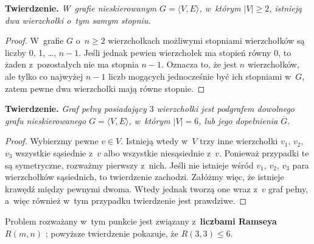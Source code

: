 
\subproblem %
\textsf{\textbf{Twierdzenie.}} \textit{W~grafie nieskierowanym\/ $G=\langle V,E\rangle$, w~którym\/ $|V|\ge2$, istnieją dwa wierzchołki o~tym samym stopniu.}
\begin{proof}
W~grafie $G$ o~$n\ge2$ wierzchołkach możliwymi stopniami wierzchołków są liczby 0, 1, \dots, $n-1$.
Jeśli jednak pewien wierzchołek ma stopień równy 0, to żaden z~pozostałych nie ma stopnia $n-1$.
Oznacza to, że jest $n$ wierzchołków, ale tylko co najwyżej $n-1$ liczb mogących jednocześnie być ich stopniami w~$G$, zatem pewne dwa wierzchołki mają równe stopnie.
\end{proof}

\subproblem %
\textsf{\textbf{Twierdzenie.}} \textit{Graf pełny posiadający\/ $3$ wierzchołki jest podgrafem dowolnego grafu nieskierowanego\/ $G=\langle V,E\rangle$, w~którym\/ $|V|=6$, lub jego dopełnienia\/ $\overline{G}$.}
\begin{proof}
Wybierzmy pewne $v\in V$.
Istnieją wtedy w~$V$ trzy inne wierzchołki $v_1$, $v_2$, $v_3$ wszystkie sąsiednie z~$v$ albo wszystkie niesąsiednie z~$v$.
Ponieważ przypadki te są symetryczne, rozważmy pierwszy z~nich.
Jeśli nie istnieje wśród $v_1$, $v_2$, $v_3$ para wierzchołków sąsiednich, to twierdzenie zachodzi.
Załóżmy więc, że istnieje krawędź między pewnymi dwoma.
Wtedy jednak tworzą one wraz z~$v$ graf pełny, a~więc również w~tym przypadku twierdzenie jest prawdziwe.
\end{proof}

Problem rozważany w~tym punkcie jest związany z~\textbf{liczbami Ramseya} $R(m,n)$ \cite{ramseynumber}; powyższe twierdzenie pokazuje, że $R(3,3)\le6$.


